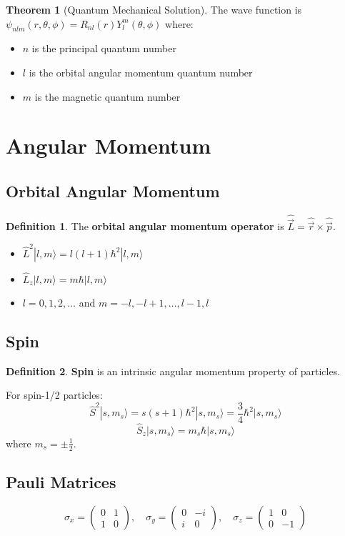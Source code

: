 \documentclass[11pt]{article}
\theoremstyle{definition}
\newtheorem{definition}{Definition}[section]
\newtheorem{theorem}{Theorem}[section]
\begin{document}
\begin{theorem}[Quantum Mechanical Solution]
The wave function is $\psi_{nlm}(r,\theta,\phi) = R_{nl}(r)Y_l^m(\theta,\phi)$ where:
\begin{itemize}
    \item $n$ is the principal quantum number
    \item $l$ is the orbital angular momentum quantum number
    \item $m$ is the magnetic quantum number
\end{itemize}
\end{theorem}

\section{Angular Momentum}

\subsection{Orbital Angular Momentum}
\begin{definition}
The \textbf{orbital angular momentum operator} is $\hat{\vec{L}} = \hat{\vec{r}} \times \hat{\vec{p}}$.
\end{definition}

\begin{itemize}
    \item $\hat{L}^2 |l,m\rangle = l(l+1)\hbar^2 |l,m\rangle$
    \item $\hat{L}_z |l,m\rangle = m\hbar |l,m\rangle$
    \item $l = 0, 1, 2, \ldots$ and $m = -l, -l+1, \ldots, l-1, l$
\end{itemize}

\subsection{Spin}
\begin{definition}
\textbf{Spin} is an intrinsic angular momentum property of particles.
\end{definition}

For spin-1/2 particles:
$$\hat{S}^2 |s,m_s\rangle = s(s+1)\hbar^2 |s,m_s\rangle = \frac{3}{4}\hbar^2 |s,m_s\rangle$$
$$\hat{S}_z |s,m_s\rangle = m_s\hbar |s,m_s\rangle$$
where $m_s = \pm\frac{1}{2}$.

\subsection{Pauli Matrices}
$$\sigma_x = \begin{pmatrix} 0 & 1 \\ 1 & 0 \end{pmatrix}, \quad \sigma_y = \begin{pmatrix} 0 & -i \\ i & 0 \end{pmatrix}, \quad \sigma_z = \begin{pmatrix} 1 & 0 \\ 0 & -1 \end{pmatrix}$$
\end{document}
